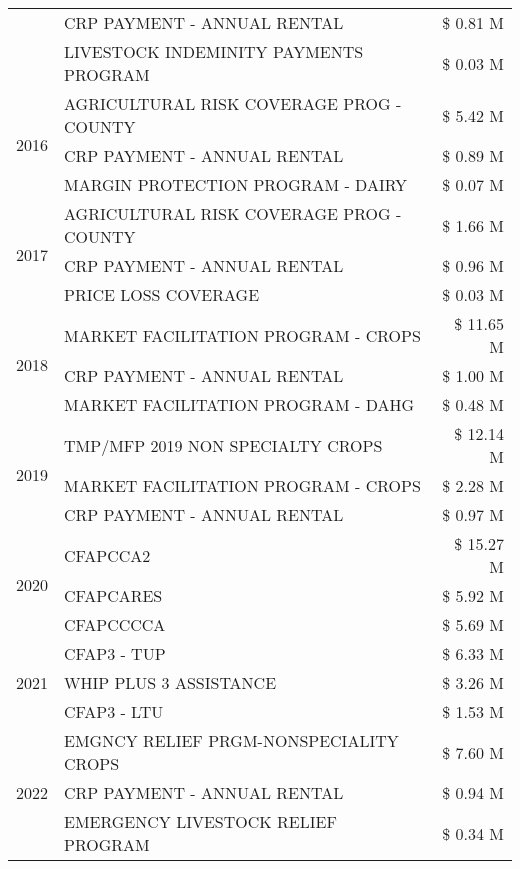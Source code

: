 \begin{tabular}{llr}
 & CRP PAYMENT - ANNUAL RENTAL & \$ 0.81 M \\
 & LIVESTOCK INDEMINITY PAYMENTS PROGRAM & \$ 0.03 M \\
\cline{1-3}
\multirow[t]{3}{*}{2016} & AGRICULTURAL RISK COVERAGE PROG - COUNTY & \$ 5.42 M \\
 & CRP PAYMENT - ANNUAL RENTAL & \$ 0.89 M \\
 & MARGIN PROTECTION PROGRAM - DAIRY & \$ 0.07 M \\
\cline{1-3}
\multirow[t]{3}{*}{2017} & AGRICULTURAL RISK COVERAGE PROG - COUNTY & \$ 1.66 M \\
 & CRP PAYMENT - ANNUAL RENTAL & \$ 0.96 M \\
 & PRICE LOSS COVERAGE & \$ 0.03 M \\
\cline{1-3}
\multirow[t]{3}{*}{2018} & MARKET FACILITATION PROGRAM - CROPS & \$ 11.65 M \\
 & CRP PAYMENT - ANNUAL RENTAL & \$ 1.00 M \\
 & MARKET FACILITATION PROGRAM - DAHG & \$ 0.48 M \\
\cline{1-3}
\multirow[t]{3}{*}{2019} & TMP/MFP 2019 NON SPECIALTY CROPS & \$ 12.14 M \\
 & MARKET FACILITATION PROGRAM - CROPS & \$ 2.28 M \\
 & CRP PAYMENT - ANNUAL RENTAL & \$ 0.97 M \\
\cline{1-3}
\multirow[t]{3}{*}{2020} & CFAPCCA2 & \$ 15.27 M \\
 & CFAPCARES & \$ 5.92 M \\
 & CFAPCCCCA & \$ 5.69 M \\
\cline{1-3}
\multirow[t]{3}{*}{2021} & CFAP3 - TUP & \$ 6.33 M \\
 & WHIP PLUS 3 ASSISTANCE & \$ 3.26 M \\
 & CFAP3 - LTU & \$ 1.53 M \\
\cline{1-3}
\multirow[t]{3}{*}{2022} & EMGNCY RELIEF PRGM-NONSPECIALITY CROPS & \$ 7.60 M \\
 & CRP PAYMENT - ANNUAL RENTAL & \$ 0.94 M \\
 & EMERGENCY LIVESTOCK RELIEF PROGRAM & \$ 0.34 M \\
\cline{1-3}
\bottomrule
\end{tabular}
